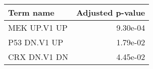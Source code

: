 \begin{tabular}{lr}
\toprule
   Term name &  Adjusted p-value \\
\midrule
MEK UP.V1 UP &          9.30e-04 \\
P53 DN.V1 UP &          1.79e-02 \\
CRX DN.V1 DN &          4.45e-02 \\
\bottomrule
\end{tabular}
